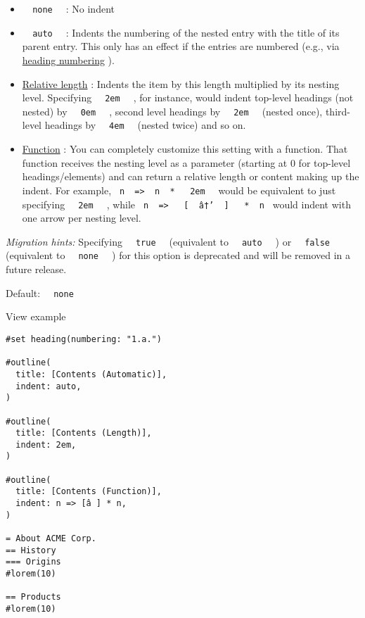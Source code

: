 \begin{itemize}
\tightlist
\item
  \texttt{\ }{\texttt{\ none\ }}\texttt{\ } : No indent
\item
  \texttt{\ }{\texttt{\ auto\ }}\texttt{\ } : Indents the numbering of
  the nested entry with the title of its parent entry. This only has an
  effect if the entries are numbered (e.g., via
  \href{/docs/reference/model/heading/\#parameters-numbering}{heading
  numbering} ).
\item
  \href{/docs/reference/layout/relative/}{Relative length} : Indents the
  item by this length multiplied by its nesting level. Specifying
  \texttt{\ }{\texttt{\ 2em\ }}\texttt{\ } , for instance, would indent
  top-level headings (not nested) by
  \texttt{\ }{\texttt{\ 0em\ }}\texttt{\ } , second level headings by
  \texttt{\ }{\texttt{\ 2em\ }}\texttt{\ } (nested once), third-level
  headings by \texttt{\ }{\texttt{\ 4em\ }}\texttt{\ } (nested twice)
  and so on.
\item
  \href{/docs/reference/foundations/function/}{Function} : You can
  completely customize this setting with a function. That function
  receives the nesting level as a parameter (starting at 0 for top-level
  headings/elements) and can return a relative length or content making
  up the indent. For example,
  \texttt{\ n\ }{\texttt{\ =\textgreater{}\ }}\texttt{\ n\ }{\texttt{\ *\ }}\texttt{\ }{\texttt{\ 2em\ }}\texttt{\ }
  would be equivalent to just specifying
  \texttt{\ }{\texttt{\ 2em\ }}\texttt{\ } , while
  \texttt{\ n\ }{\texttt{\ =\textgreater{}\ }}\texttt{\ }{\texttt{\ {[}\ }}\texttt{\ â†’\ }{\texttt{\ {]}\ }}\texttt{\ }{\texttt{\ *\ }}\texttt{\ n\ }
  would indent with one arrow per nesting level.
\end{itemize}

\emph{Migration hints:} Specifying
\texttt{\ }{\texttt{\ true\ }}\texttt{\ } (equivalent to
\texttt{\ }{\texttt{\ auto\ }}\texttt{\ } ) or
\texttt{\ }{\texttt{\ false\ }}\texttt{\ } (equivalent to
\texttt{\ }{\texttt{\ none\ }}\texttt{\ } ) for this option is
deprecated and will be removed in a future release.

Default: \texttt{\ }{\texttt{\ none\ }}\texttt{\ }


View example

\begin{verbatim}
#set heading(numbering: "1.a.")

#outline(
  title: [Contents (Automatic)],
  indent: auto,
)

#outline(
  title: [Contents (Length)],
  indent: 2em,
)

#outline(
  title: [Contents (Function)],
  indent: n => [â ] * n,
)

= About ACME Corp.
== History
=== Origins
#lorem(10)

== Products
#lorem(10)
\end{verbatim}

